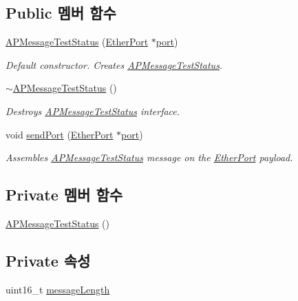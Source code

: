 \subsection*{Public 멤버 함수}
\begin{DoxyCompactItemize}
\item 
\hyperlink{class_a_p_message_test_status_a7f1d7dc41073ffb8a53c3d9dc6133b96}{A\+P\+Message\+Test\+Status} (\hyperlink{class_ether_port}{Ether\+Port} $\ast$\hyperlink{gst__avb__playbin_8c_a63c89c04d1feae07ca35558055155ffb}{port})
\begin{DoxyCompactList}\small\item\em Default constructor. Creates \hyperlink{class_a_p_message_test_status}{A\+P\+Message\+Test\+Status}. \end{DoxyCompactList}\item 
\hyperlink{class_a_p_message_test_status_a0661ddbc0bc4858e81d5a73bedcd60a2}{$\sim$\+A\+P\+Message\+Test\+Status} ()
\begin{DoxyCompactList}\small\item\em Destroys \hyperlink{class_a_p_message_test_status}{A\+P\+Message\+Test\+Status} interface. \end{DoxyCompactList}\item 
void \hyperlink{class_a_p_message_test_status_ac5f42348a1173af6a28f40d24eae897a}{send\+Port} (\hyperlink{class_ether_port}{Ether\+Port} $\ast$\hyperlink{gst__avb__playbin_8c_a63c89c04d1feae07ca35558055155ffb}{port})
\begin{DoxyCompactList}\small\item\em Assembles \hyperlink{class_a_p_message_test_status}{A\+P\+Message\+Test\+Status} message on the \hyperlink{class_ether_port}{Ether\+Port} payload. \end{DoxyCompactList}\end{DoxyCompactItemize}
\subsection*{Private 멤버 함수}
\begin{DoxyCompactItemize}
\item 
\hyperlink{class_a_p_message_test_status_a820d10071abca0f3eaa0b257dc7b463e}{A\+P\+Message\+Test\+Status} ()
\end{DoxyCompactItemize}
\subsection*{Private 속성}
\begin{DoxyCompactItemize}
\item 
uint16\+\_\+t \hyperlink{class_a_p_message_test_status_a6c490faee54bca860c4d897aae50990f}{message\+Length}
\end{DoxyCompactItemize}


